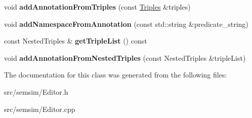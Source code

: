 \begin{DoxyCompactItemize}
void {\bfseries add\+Annotation\+From\+Triples} (const \hyperlink{classsemsim_1_1Triples}{Triples} \&triples)
\item 
\mbox{\label{classsemsim_1_1Editor_a17b71f98094e88a969ddc5a8343ac907}} 
void {\bfseries add\+Namespace\+From\+Annotation} (const std\+::string \&predicate\+\_\+string)
\item 
\mbox{\label{classsemsim_1_1Editor_a5e131dc2542cc90b9cfa0acb0e44494a}} 
const Nested\+Triples \& {\bfseries get\+Triple\+List} () const
\item 
\mbox{\label{classsemsim_1_1Editor_a568217536224ef866595981bb4b35e5b}} 
void {\bfseries add\+Annotation\+From\+Nested\+Triples} (const Nested\+Triples \&triple\+List)
\end{DoxyCompactItemize}


The documentation for this class was generated from the following files\+:\begin{DoxyCompactItemize}
\item 
src/semsim/Editor.\+h\item 
src/semsim/Editor.\+cpp\end{DoxyCompactItemize}
